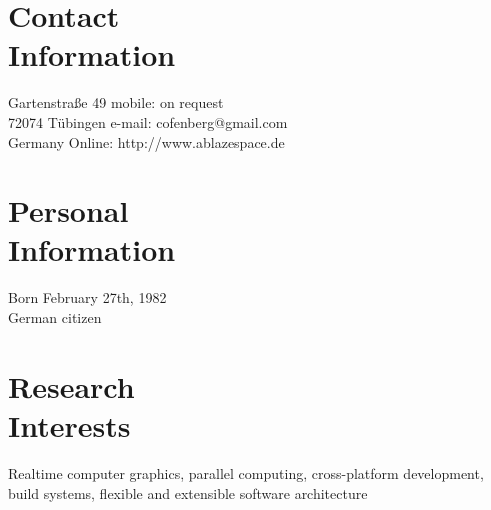 \documentclass[margin,line]{Ofenberg_Resume}
\begin{document}
\begin{resume}

	\section{\mysidestyle Contact\\Information}

	Gartenstra\ss{}e 49											\hfill mobile: on request									\vspace{0mm}\\\vspace{0mm}%
	72074 T\"ubingen										\hfill e-mail: cofenberg@gmail.com	\vspace{0mm}\\\vspace{0mm}%
	Germany													\hfill Online: http://www.ablazespace.de	\vspace{0mm}\\\vspace{-4.5mm}%


	\section{\mysidestyle Personal\\Information}
	Born February 27th, 1982\\
	German citizen


	\section{\mysidestyle Research\\Interests}

	Realtime computer graphics, parallel computing, cross-platform development,\\
	build systems, flexible and extensible software architecture



\end{resume}
\end{document}
